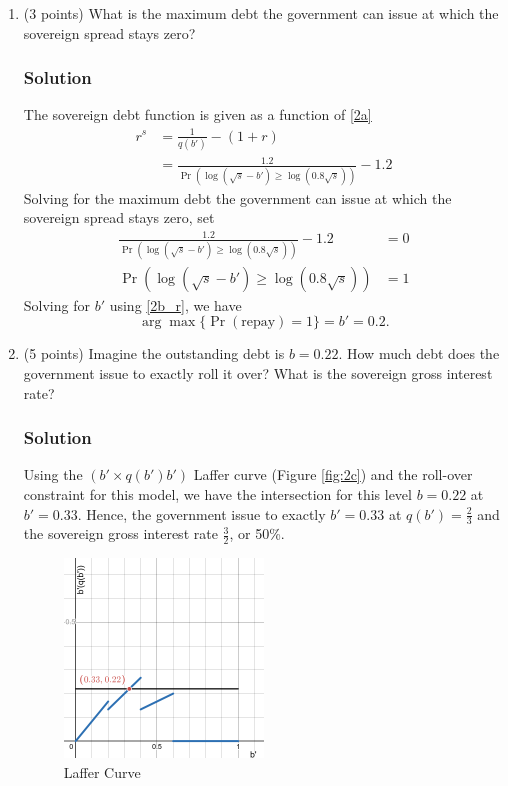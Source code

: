 \documentclass[12pt]{article}
\begin{document}
\begin{enumerate}
\begin{enumerate}[label=(\alph*)]
        \item (3 points) What is the maximum debt the government can issue at which the sovereign spread stays zero?
        \subsubsection*{Solution}

        The sovereign debt function is given as a function of \eqref{2a}
        \begin{align*}
            r^s &= \frac{1}{q(b')} - (1+r) 
            \\ &= \frac{1.2}{\Pr\left( \log(\sqrt{s} - b') \geq \log(0.8\sqrt{s})   \right)} - 1.2
        \end{align*}
        Solving for the maximum debt the government can issue at which the sovereign spread stays zero, set
        \begin{align*}
            \frac{1.2}{\Pr\left( \log(\sqrt{s} - b') \geq \log(0.8\sqrt{s})   \right)} - 1.2 &= 0
            \\ \Pr\left( \log(\sqrt{s} - b') \geq \log(0.8\sqrt{s})   \right) &= 1
        \end{align*}
        Solving for $b'$ using \eqref{2b_r}, we have 
        \[ \arg\max \{\Pr(\text{repay})=1\}= \boxed{b' = 0.2}.\]
        
        \item (5 points) Imagine the outstanding debt is $b = 0.22$. How much debt does the government issue to exactly roll it over? What is the sovereign gross interest rate?
        \subsubsection*{Solution}

        Using the $(b' \times  q(b')b')$ Laffer curve (Figure \eqref{fig:2c}) and the roll-over constraint for this model, we have the intersection for this level $b = 0.22$ at $b' = 0.33.$ Hence,  the government issue to exactly $b' = 0.33$ at $q(b') = \frac{2}{3}$ and the sovereign gross interest rate $\frac{3}{2}$, or 50\%.
        \begin{figure}[h]
            \centering
                \includegraphics[width=0.5\textwidth]{pset2/2c_latter_curve.png}
                \caption{Laffer Curve}
                \label{fig:2c}
        \end{figure}
        

\end{enumerate}
\end{enumerate}
\end{document}
